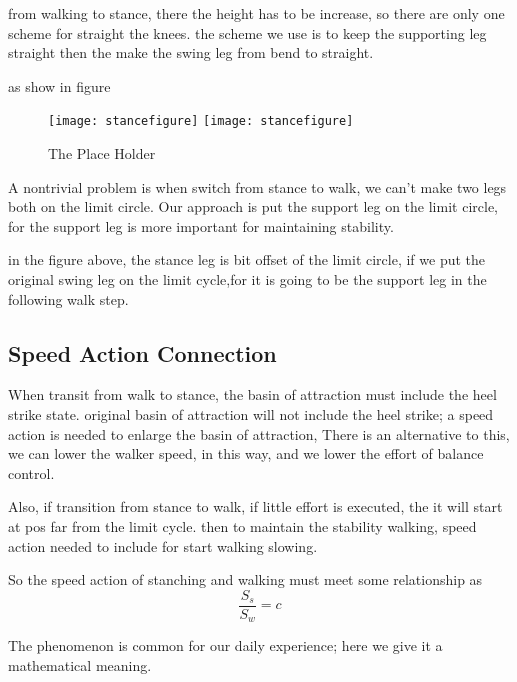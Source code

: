 from walking to stance, there the height has to be increase, so there are only one scheme for straight the knees.
the scheme we use is to keep the supporting leg straight then the make the swing leg from bend to straight.

as show in figure
\begin{figure}[!htbp]
  \begin{center}
    \leavevmode
    \ifpdf
      \texttt{[image: stancefigure]}
    \else
      \texttt{[image: stancefigure]}
    \fi
    \caption{The Place Holder}
    \label{fig:stance2walk}
\end{center}
\end{figure}


A nontrivial problem is when switch from stance to walk, 
we can't make two legs both on the limit circle.
Our approach is put the support leg on the limit circle, for the support leg is more important for maintaining stability.


in the figure above, the stance leg is bit offset of the limit circle, if we put the original swing leg on the limit cycle,for it is going to be the support leg in the following walk step.


\subsection{Speed Action Connection}
When transit from walk to stance, the basin of attraction must include the heel strike state.
original basin of attraction will not include the heel strike; a speed action is needed to enlarge the basin of attraction,
There is an alternative to this, we can lower the walker speed, in this way, and we lower the effort of balance control.

Also, if transition from stance to walk, if little effort is executed, the it will start at pos far from the limit cycle.
then to maintain the stability walking, speed action needed to include for start walking slowing.

So the speed action of stanching and walking must meet some relationship as
\[
\frac{S_s}{S_w}=c
\]

The phenomenon is common for our daily experience; here we give it a mathematical meaning.























